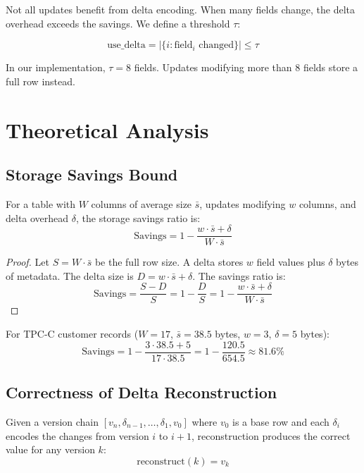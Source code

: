 \documentclass[letterpaper,twocolumn,10pt]{article}
\begin{document}
Not all updates benefit from delta encoding. When many fields change, the delta overhead exceeds the savings. We define a threshold $\tau$:

\[
\text{use\_delta} = |\{i : \text{field}_i \text{ changed}\}| \leq \tau
\]

In our implementation, $\tau = 8$ fields. Updates modifying more than 8 fields store a full row instead.

\section{Theoretical Analysis}
\label{sec:theory}

\subsection{Storage Savings Bound}

\begin{theorem}
For a table with $W$ columns of average size $\bar{s}$, updates modifying $w$ columns, and delta overhead $\delta$, the storage savings ratio is:
\[
\text{Savings} = 1 - \frac{w \cdot \bar{s} + \delta}{W \cdot \bar{s}}
\]
\end{theorem}

\begin{proof}
Let $S = W \cdot \bar{s}$ be the full row size. A delta stores $w$ field values plus $\delta$ bytes of metadata. The delta size is $D = w \cdot \bar{s} + \delta$. The savings ratio is:
\[
\text{Savings} = \frac{S - D}{S} = 1 - \frac{D}{S} = 1 - \frac{w \cdot \bar{s} + \delta}{W \cdot \bar{s}}
\]
\end{proof}

\begin{corollary}
For TPC-C customer records ($W=17$, $\bar{s}=38.5$ bytes, $w=3$, $\delta=5$ bytes):
\[
\text{Savings} = 1 - \frac{3 \cdot 38.5 + 5}{17 \cdot 38.5} = 1 - \frac{120.5}{654.5} \approx 81.6\%
\]
\end{corollary}

\subsection{Correctness of Delta Reconstruction}

\begin{theorem}
Given a version chain $[v_n, \delta_{n-1}, \ldots, \delta_1, v_0]$ where $v_0$ is a base row and each $\delta_i$ encodes the changes from version $i$ to $i+1$, reconstruction produces the correct value for any version $k$:
\[
\text{reconstruct}(k) = v_k
\]
\end{theorem}
\end{document}
